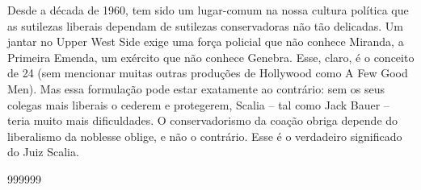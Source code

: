 \par
 
Desde a década de 1960, tem sido um lugar-comum na nossa cultura política que as sutilezas liberais dependam de sutilezas conservadoras não tão delicadas. Um jantar no Upper West Side exige uma força policial que não conhece Miranda, a Primeira Emenda, um exército que não conhece Genebra. Esse, claro, é o conceito de
 {\color{blue} 24}  
(sem mencionar muitas outras produções de Hollywood como A Few Good Men). Mas essa formulação pode estar exatamente ao contrário: sem os seus colegas mais liberais o cederem e protegerem, Scalia – tal como Jack Bauer – teria muito mais dificuldades. O conservadorismo da coação obriga depende do liberalismo da noblesse oblige, e não o contrário. Esse é o verdadeiro significado do Juiz Scalia.
 
\par
  
 
999999
